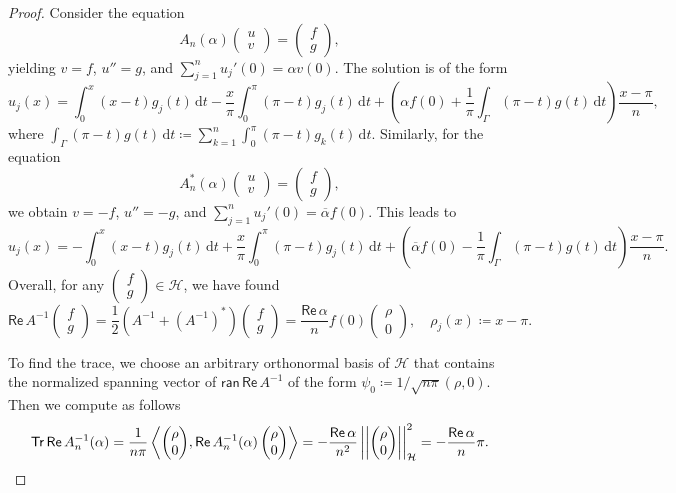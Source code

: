 \documentclass[11pt, a4paper,reqno]{amsart}
\theoremstyle{plain}
\theoremstyle{definition}
\theoremstyle{remark}
\newcommand{\inner}[2]{\left\langle{#1}, {#2}\right\rangle}
\newcommand{\dd}{\,\textrm{d}}
\newcommand{\norm}[1]{\left|\left|#1\right|\right|}
\newcommand{\1}{\mathds 1}
\renewcommand{\Re}{\mathsf{Re}\,}
\newcommand{\Tr}{\mathsf{Tr}\,}
\newcommand{\Ran}{\mathsf{ran}\,}
\begin{document}
\begin{proof}
    Consider the equation
\[
A_n(\alpha)\begin{pmatrix}
    u \\ v
\end{pmatrix} = \begin{pmatrix}
    f \\ g
\end{pmatrix},
\]
yielding $v = f$, $u'' = g$, and $\sum_{j=1}^nu_j'(0) = \alpha v(0)$. The solution is of the form
\[
u_j(x) = \int_0^x(x-t)g_j(t)\dd t - \frac{x}{\pi}\int_0^\pi(\pi-t)g_j(t) \dd t + \left(\alpha f(0) + \frac{1}{\pi}\int_\Gamma (\pi-t)g(t) \dd t\right)\frac{x-\pi}{n},
\]
where $\int_\Gamma (\pi-t)g(t)\dd t \coloneqq \sum_{k=1}^n \int_{0}^\pi(\pi-t)g_k(t) \dd t$.
Similarly, for the equation
\[
A^\ast_n(\alpha)\begin{pmatrix}
    u \\ v
\end{pmatrix} = \begin{pmatrix}
    f \\ g
\end{pmatrix},
\]
we obtain $v = -f$, $u'' = -g$, and $\sum_{j=1}^nu_j'(0) = \overline{\alpha}f(0)$.
This leads to
\[
u_j(x) = -\int_0^x(x-t)g_j(t)\dd t + \frac{x}{\pi}\int_0^\pi(\pi-t)g_j(t) \dd t + \left(\overline\alpha f(0) - \frac{1}{\pi}\int_\Gamma (\pi-t)g(t) \dd t\right)\frac{x-\pi}{n}.
\]
Overall, for any $\begin{pmatrix}
    f \\ g
\end{pmatrix} \in \mathcal H$, we have found
\[
\Re A^{-1}\begin{pmatrix}
    f \\ g
\end{pmatrix} = \frac{1}{2}\left(A^{-1} +(A^{-1})^\ast\right)\begin{pmatrix}
    f \\ g
\end{pmatrix} = \frac{\Re \alpha}{n}f(0)\begin{pmatrix}
    \rho \\ 0
\end{pmatrix}, \quad \rho_j(x) \coloneqq x- \pi.
\]


To find the trace, we choose an arbitrary orthonormal basis of $\mathcal H$ that contains the normalized spanning vector of $\Ran \Re A^{-1}$ of the form $\psi_0 \coloneqq 1/\sqrt{n\pi}(\rho, 0)$.
Then we compute as follows
\[
    \Tr\Re A_n^{-1}(\alpha) = \frac{1}{n\pi}\inner{\begin{pmatrix}
        \rho \\ 0
    \end{pmatrix}}{\Re A_n^{-1}(\alpha) \begin{pmatrix}
        \rho \\ 0
    \end{pmatrix}} = -\frac{\Re \alpha}{n^2}\norm{\begin{pmatrix}
        \rho \\ 0
    \end{pmatrix}}^2_\mathcal H = -\frac{\Re \alpha}{n}\pi.
    \qedhere
\]
\end{proof}
\end{document}
